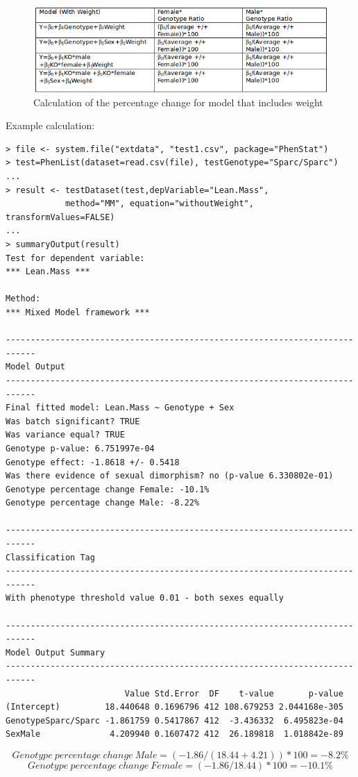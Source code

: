 \documentclass[12pt,a4paper]{article}
\begin{document}
\begin{figure}[!htpb]%
\centerline{\includegraphics[scale=0.6]{BiologicalEffect2.png}}
\caption{Calculation of the percentage change for model that includes weight}\label{fig:05_be2}
\end{figure}

Example calculation:
\begingroup
\fontsize{8pt}{12pt}\selectfont
\begin{verbatim}
> file <- system.file("extdata", "test1.csv", package="PhenStat")
> test=PhenList(dataset=read.csv(file), testGenotype="Sparc/Sparc")
...
> result <- testDataset(test,depVariable="Lean.Mass", 
			method="MM", equation="withoutWeight", transformValues=FALSE)
...			
> summaryOutput(result)
Test for dependent variable:
*** Lean.Mass ***

Method:
*** Mixed Model framework ***

----------------------------------------------------------------------------
Model Output
----------------------------------------------------------------------------
Final fitted model: Lean.Mass ~ Genotype + Sex
Was batch significant? TRUE
Was variance equal? TRUE
Genotype p-value: 6.751997e-04
Genotype effect: -1.8618 +/- 0.5418
Was there evidence of sexual dimorphism? no (p-value 6.330802e-01)
Genotype percentage change Female: -10.1%
Genotype percentage change Male: -8.22%

----------------------------------------------------------------------------
Classification Tag
----------------------------------------------------------------------------
With phenotype threshold value 0.01 - both sexes equally

----------------------------------------------------------------------------
Model Output Summary
----------------------------------------------------------------------------
                        Value Std.Error  DF    t-value       p-value
(Intercept)         18.440648 0.1696796 412 108.679253 2.044168e-305
GenotypeSparc/Sparc -1.861759 0.5417867 412  -3.436332  6.495823e-04
SexMale              4.209940 0.1607472 412  26.189818  1.018842e-89
\end{verbatim}
\endgroup 
\[
Genotype\:percentage\:change\:Male = (-1.86/(18.44+4.21))*100=-8.2\%
\]
\[
Genotype\:percentage\:change\:Female = (-1.86/18.44)*100=-10.1\%
\]
\end{document}

